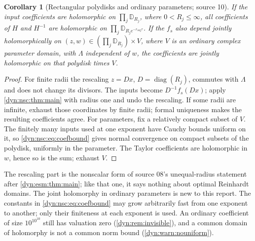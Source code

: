 \documentclass[11pt,letterpaper]{article}
\newtheorem{corollary}[corollary]{Corollary}
\theoremstyle{definition}
\theoremstyle{remark}
\newcommand{\rang}{r_{\mathrm{ang}}}
\numberwithin{equation}{section}
\begin{document}
\begin{corollary}[Rectangular polydisks and ordinary parameters; source 10]
\label{dyn:nsc:cor:parameters}
If the input coefficients are holomorphic on $\prod_j\mathbb D_{R_j}$,
where $0<R_j\le\infty$, all
coefficients of $H$ and $H^{-1}$ are holomorphic on
$\prod_j\mathbb D_{R_je^{-\rang\tau}}$. If the $f_s$ also depend
jointly holomorphically on $(z,w)\in(\prod_j\mathbb D_{R_j})\times V$,
where $V$ is an ordinary complex parameter domain, with
$\Lambda$ independent of $w$, the coefficients are jointly holomorphic on
that polydisk times $V$.
\end{corollary}
\begin{proof}
For finite radii the rescaling $z=Dx$, $D=\operatorname{diag}(R_j)$,
commutes with $\Lambda$ and does not change its divisors. The inputs become
$D^{-1}f_s(Dx)$; apply \cref{dyn:nsc:thm:main} with radius one and undo
the rescaling. If some radii are infinite, exhaust those coordinates by
finite radii; formal uniqueness makes the resulting coefficients agree.
For parameters, fix a relatively compact subset of $V$. The finitely
many inputs used at one exponent have Cauchy bounds uniform on it, so
\eqref{dyn:nsc:eq:coefbound} gives normal convergence on compact subsets of
the polydisk, uniformly in the parameter. The Taylor coefficients are
holomorphic in $w$, hence so is the sum; exhaust $V$.
\end{proof}

The rescaling part is the nonscalar form of source 08's unequal-radius
statement after \cref{dyn:esm:thm:main}; like that one, it says nothing
about optimal Reinhardt domains. The joint holomorphy in ordinary
parameters is new to this report. The constants in
\eqref{dyn:nsc:eq:coefbound} may grow arbitrarily fast from one exponent to
another; only their finiteness at each exponent is used. An ordinary
coefficient of size $10^{10^{10}}$ still has valuation zero
(\cref{dyn:rem:invisible}), and a common domain of holomorphy is not a
common norm bound (\cref{dyn:warn:nouniform}).
\end{document}
